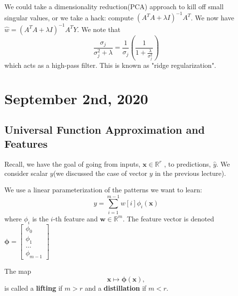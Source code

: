 \documentclass[11pt]{scrartcl}
\newcommand{\R}{\mathbb{R}}
\newcommand{\Vw}{\mathbf{w}}
\newcommand{\Vx}{\mathbf{x}}
\begin{document}
 We could take a dimensionality reduction(PCA) approach to kill off small singular values, or we take a hack: compute $(A^TA + \lambda I)^{-1}A^T$.  We now have $\hat{w}  = (A^TA + \lambda I)^{-1}A^T Y$.  We note that 
$$\frac{\sigma_j}{\sigma_j^2 + \lambda} = \frac{1}{\sigma_j}\left (\frac{1}{1 + \frac{\lambda}{\sigma_j^2}}\right)$$
which acts as a high-pass filter.  This is known as "ridge regularization".
\newpage
\section{September 2nd, 2020}
\subsection{Universal Function Approximation and Features}
Recall, we have the goal of going from inputs, $\Vx \in \R^r$ , to predictions, $\hat{y}$.  We consider scalar $y$(we discussed the case of vector $y$ in the previous lecture).  

We use a linear parameterization of the patterns we want to learn:
$$y = \sum_{i=1}^{m-1} w[i]\phi_i(\Vx)$$
where $\phi_i$ is the $i$-th feature and $\Vw \in \R^m$.
The feature vector is denoted $\mathbf{\phi} = \begin{bmatrix}
\phi_0 \\ \phi_1 \\ \dots \\ \phi_{m-1}
\end{bmatrix}$

The map $$\Vx \mapsto \mathbf{\phi}(\Vx),$$
is called a \textbf{lifting} if $m > r$ and a \textbf{distillation} if $m < r$.
\end{document}
